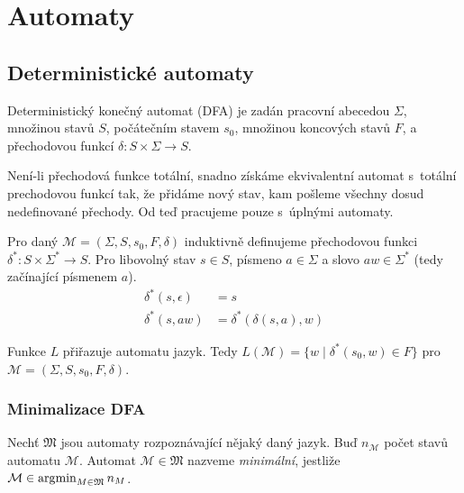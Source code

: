 \section{Automaty}

\subsection{Deterministické automaty}

\begin{definition}
    Deterministický konečný automat (DFA) je zadán
    pracovní abecedou $\Sigma$,
    množinou stavů $S$,
    počátečním stavem $s_0$,
    množinou koncových stavů $F$,
    a přechodovou funkcí $\delta : S \times \Sigma \to S$.
\end{definition}

Není-li přechodová funkce totální, snadno získáme ekvivalentní automat
s~totální prechodovou funkcí tak, že přidáme nový stav, kam pošleme
všechny dosud nedefinované přechody. Od teď pracujeme pouze s~úplnými
automaty.

\begin{definition}
    Pro daný $\mathcal{M} = (\Sigma, S, s_0, F, \delta)$
    induktivně definujeme přechodovou funkci
    $\delta^* : S \times \Sigma^* \to S$.
    Pro libovolný stav $s \in S$, písmeno $a \in \Sigma$ a
    slovo $aw \in \Sigma^*$ (tedy začínající písmenem $a$).
\begin{align*}
    \delta^*(s, \epsilon) &= s \\
    \delta^*(s, aw) &= \delta^*(\delta(s,a), w)
\end{align*}
\end{definition}

\begin{definition}
    Funkce $L$ přiřazuje automatu jazyk. Tedy
    $L(\mathcal{M}) = \{ w \mid \delta^*(s_0, w) \in F \}$
    pro $\mathcal{M} = (\Sigma, S, s_0, F, \delta)$.
\end{definition}

\subsubsection{Minimalizace DFA}

\begin{definition}
    Nechť $\mathfrak{M}$ jsou automaty rozpoznávající nějaký daný jazyk.
    Buď $n_\mathcal{M}$ počet stavů automatu $\mathcal{M}$.
    Automat $\mathcal{M} \in \mathfrak{M}$ nazveme {\em minimální},
    jestliže $\mathcal{M} \in \operatorname*{\arg\!\min}_{M \in \mathfrak{M}} n_M$.
\end{definition}

